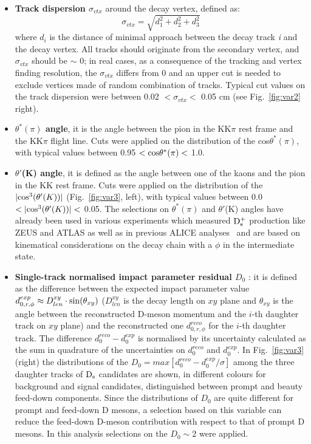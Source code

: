 \begin{itemize}
\item \textbf{Track dispersion $\sigma_{vtx}$} around the decay vertex, defined as:
\[
\sigma_{vtx}=\sqrt{d^2_1+d^2_2+d^2_3}
\]
where $d_i$ is the distance of minimal approach between the decay 
track \textit{i} and the decay vertex. All tracks should originate from 
the secondary vertex, and $\sigma_{vtx}$ should be $\sim$ 0; in 
real cases, as a consequence of the tracking and vertex finding resolution, 
the $\sigma_{vtx}$ differs from 0 and an upper cut is needed 
to exclude vertices made of random combination of tracks. Typical cut
 values on the track dispersion were between 0.02 $< \sigma_{vtx}<$ 0.05 cm 
 (see Fig.~\ref{fig:var2} right).
\item \textbf{$\theta^*(\pi)$ angle}, it is the angle between the pion 
in the KK$\pi$ rest frame and the KK$\pi$ flight line. Cuts were applied
 on the distribution of the cos$\theta^*(\pi)$, with typical values 
 between 0.95 $<{\rm cos}\theta^*(\pi)  <$ 1.0.
\item \textbf{$\theta'$(K) angle}, it is defined as the angle between
 one of the kaons and the pion in the KK rest frame. Cuts were 
 applied on the distribution of the $|{\rm cos}^3(\theta'(K))|$ (Fig.~\ref{fig:var3}, left), with typical 
 values between 0.0 $<|{\rm cos}^3(\theta'(K))| <$ 0.05.
 The selections on $\theta^*(\pi)$ and $\theta'$(K) angles have already 
been used in various experiments which measured ${\rm D_s^+}$ production 
like ZEUS \cite{Chekanov:2005mm} and ATLAS \cite{ATLAS:2011fea} as well as 
in previous ALICE analyses~\cite{ALICE:2011aa,Abelev:2012tca,Adam:2016ich,Adam:2015jda}
 and are based on kinematical 
considerations on the decay chain with a $\phi$ in the intermediate state.
\item \textbf{Single-track normalised impact parameter residual $D_{0}$} : it is defined 
as the difference between the expected 
impact parameter value $d^{exp}_{0,r,\phi} \approx D_{len}^{xy} \cdot {\rm sin}(\theta_{xy})$
 ($D_{len}^{xy}$ is the decay length on $xy$ plane and $\theta_{xy}$ is the angle 
between the reconstructed D-meson momentum and the $i$-th daughter track on $xy$ plane) 
and the reconstructed one $d^{reco}_{0,r,\phi}$ for the $i$-th daughter
track. The difference $d^{reco}_{0}-d^{exp}_{0}$ is normalised by its uncertainty
calculated as the sum in quadrature of the uncertainties on $d^{reco}_{0}$ and $d^{exp}_{0}$.
In Fig.~\ref{fig:var3} (right) the distributions of the $D_{0} = max[d^{reco}_{0}-d^{exp}_{0}/\sigma]$ among 
the three daughter tracks of ${\rm D_s}$ candidates are shown, in different colours for
background and signal candidates, distinguished between prompt and beauty 
feed-down components. Since the distributions of $D_{0}$ 
are quite different for prompt and feed-down D mesons, 
a selection based on this variable can reduce the feed-down D-meson contribution with respect to 
that of prompt D mesons. In this analysis selections on the $D_{0} \sim 2$
were applied.
\end{itemize}

